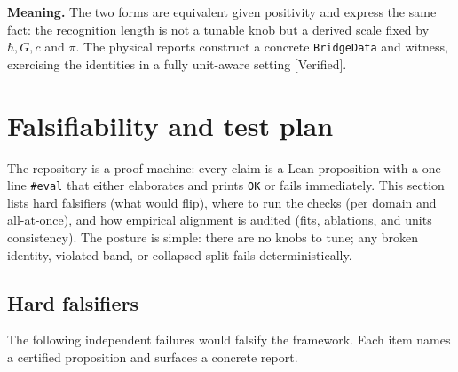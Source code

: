 \documentclass[11pt,a4paper,twoside]{article}
\numberwithin{equation}{section}
\theoremstyle{customthm}
\theoremstyle{customdef}
\theoremstyle{customrem}
\begin{document}
\noindent \textbf{Meaning.} The two forms are equivalent given positivity and express the same fact: the recognition length is not a tunable knob but a derived scale fixed by \(\hbar,G,c\) and \(\pi\). The physical reports construct a concrete \texttt{BridgeData} and witness, exercising the identities in a fully unit-aware setting [Verified].

\section{Falsifiability and test plan}\label{sec:falsifiability}

The repository is a proof machine: every claim is a Lean proposition with a one-line \texttt{\#eval} that either elaborates and prints \texttt{OK} or fails immediately. This section lists hard falsifiers (what would flip), where to run the checks (per domain and all-at-once), and how empirical alignment is audited (fits, ablations, and units consistency). The posture is simple: there are no knobs to tune; any broken identity, violated band, or collapsed split fails deterministically.

\subsection{Hard falsifiers}

The following independent failures would falsify the framework. Each item names a certified proposition and surfaces a concrete report.
\end{document}
